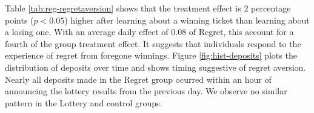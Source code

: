 \documentclass[11pt]{article}
\begin{document}
		Table \ref{tab:reg-regretaversion} shows that the treatment effect is 2 percentage points ($p<0.05$) higher after learning about a winning ticket than learning about a losing one. With an average daily effect of 0.08 of Regret, this account for a fourth of the group treatment effect. It suggests that individuals respond to the experience of regret from foregone winnings. Figure \ref{fig:hist-deposits} plots the distribution of deposits over time and shows timing suggestive of regret aversion. Nearly all deposits made in the Regret group ocurred within an hour of announcing the lottery results from the previous day. We observe no similar pattern in the Lottery and control groups.

		

		\clearpage




\end{document}

